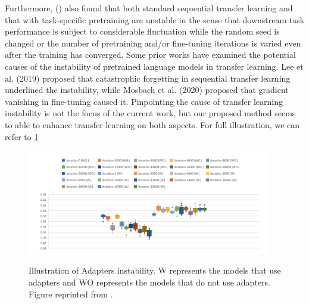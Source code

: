 Furthermore, (\cite{han2021robust}) also found that both standard sequential transfer learning and that with task-specific pretraining are unstable in the sense that downstream task performance is subject to considerable fluctuation while the random seed is changed or the number of pretraining and/or fine-tuning iterations is varied even after the training has converged. Some prior works have examined the potential causes of the instability of pretrained language models in transfer learning. Lee et al. (2019) proposed that catastrophic forgetting in sequential transfer learning underlined the instability, while Mosbach et al. (2020) proposed that gradient vanishing in fine-tuning caused it. Pinpointing the cause of transfer learning instability is not the focus of the current work, but our proposed method seems to able to enhance transfer learning on both
aspects. For full illustration, we can refer to \ref{img:adapters_instability}

\begin{figure}[h]
    {\includegraphics[width=0.95\textwidth]{img/adapters_instability.png}}
    \centering
    \caption{Illustration of Adapters instability. W represents the models that use adapters and WO represents the models that do not use adapters. Figure reprinted from \cite{han2021robust}.}
    \label{img:adapters_instability}
\end{figure}